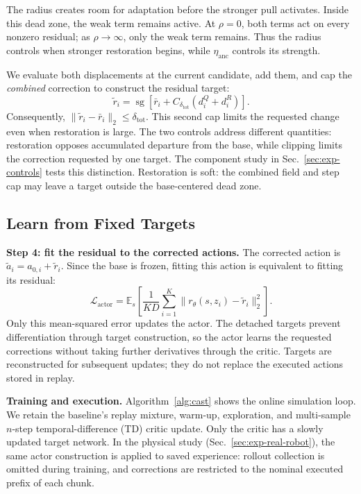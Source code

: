 The radius creates room for adaptation before the stronger pull activates.
Inside this dead zone, the weak term remains active. At $\rho=0$, both
terms act on every nonzero residual; as $\rho\to\infty$, only the weak
term remains. Thus the radius controls when stronger restoration begins,
while $\eta_{\mathrm{anc}}$ controls its strength.

We evaluate both displacements at the current candidate, add them, and
cap the \emph{combined} correction to construct the residual target:
\begin{equation}
  \tilde r_i=\operatorname{sg}\!\left[
    \bar r_i+C_{\delta_{\mathrm{tot}}}(d_i^Q+d_i^R)
  \right].
  \label{eq:field-target}
\end{equation}
Consequently, $\|\tilde r_i-\bar r_i\|_2\leq\delta_{\mathrm{tot}}$.
This second cap limits the requested change even when restoration is
large. The two controls address different quantities: restoration opposes
accumulated departure from the base, while clipping limits the correction
requested by one target. The component study in
Sec.~\ref{sec:exp-controls} tests this distinction. Restoration is soft:
the combined field and step cap may leave a target outside the
base-centered dead zone.

\subsection{Learn from Fixed Targets}
\label{sec:field-update}

\textbf{Step 4: fit the residual to the corrected actions.}
The corrected action is $\tilde a_i=a_{0,i}+\tilde r_i$. Since the base
is frozen, fitting this action is equivalent to fitting its residual:
\begin{equation}
  \mathcal L_{\mathrm{actor}}
    =\mathbb{E}_{s}\!\left[
      \frac{1}{KD}\sum_{i=1}^{K}
      \|r_\theta(s,z_i)-\tilde r_i\|_2^2
    \right].
  \label{eq:actor-regression}
\end{equation}
Only this mean-squared error updates the actor. The detached targets
prevent differentiation through target construction, so the actor learns
the requested corrections without taking further derivatives through the
critic. Targets are reconstructed for subsequent updates; they do not
replace the executed actions stored in replay.

\textbf{Training and execution.}
Algorithm~\ref{alg:cast} shows the online simulation loop. We retain the
baseline's replay mixture, warm-up, exploration, and multi-sample $n$-step
temporal-difference (TD) critic update. Only the critic has a slowly updated
target network. In the physical study (Sec.~\ref{sec:exp-real-robot}), the
same actor construction is applied to saved experience: rollout collection
is omitted during training, and corrections are restricted to the nominal
executed prefix of each chunk.

